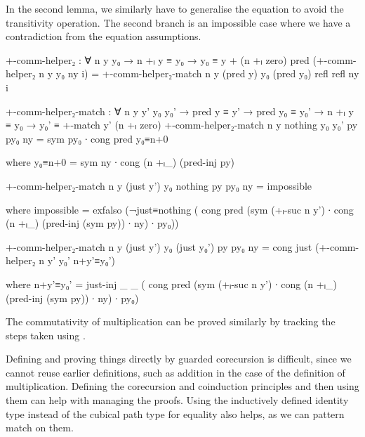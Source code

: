 In the second lemma, we similarly have to generalise the equation to avoid the
transitivity operation. The second branch is an impossible case where we have a
contradiction from the equation assumptions.
\begin{AgdaSuppressSpace}
\begin{code}
  +-comm-helper₂ :
    ∀ n y y₀ → n +ₗ y ≡ y₀ → y₀ ≡ y + (n +ₗ zero)
  pred (+-comm-helper₂ n y y₀ ny i) =
    +-comm-helper₂-match
      n y (pred y) y₀ (pred y₀) refl refl ny i

  +-comm-helper₂-match :
    ∀ n y y' y₀ y₀' →
    pred y ≡ y' → pred y₀ ≡ y₀' → n +ₗ y ≡ y₀ →
    y₀' ≡ +-match y' (n +ₗ zero)
  +-comm-helper₂-match n y nothing y₀ y₀' py py₀ ny =
    sym py₀ ∙ cong pred y₀≡n+0
\end{code}
\begin{code}[hide]
    where
    y₀≡n+0 = sym ny ∙ cong (n +ₗ_) (pred-inj py)
\end{code}
\begin{code}
  +-comm-helper₂-match n y (just y') y₀ nothing py py₀ ny
    = impossible
\end{code}
\begin{code}[hide]
    where
    impossible =
      exfalso
        (¬just≡nothing
          ( cong pred
              (sym (+ₗ-suc n y') ∙ cong (n +ₗ_) (pred-inj (sym py)) ∙ ny) ∙
            py₀))
\end{code}
\begin{code}
  +-comm-helper₂-match n y (just y') y₀ (just y₀') py py₀ ny
    = cong just (+-comm-helper₂ n y' y₀' n+y'≡y₀')
\end{code}
\begin{code}[hide]
    where
    n+y'≡y₀' =
      just-inj _ _
        ( cong pred
            (sym (+ₗ-suc n y') ∙ cong (n +ₗ_) (pred-inj (sym py)) ∙ ny) ∙
          py₀)
\end{code}
\end{AgdaSuppressSpace}

The commutativity of multiplication can be proved similarly by tracking the
steps taken using .

Defining and proving things directly by guarded corecursion is difficult, since
we cannot reuse earlier definitions, such as addition in the case of the
definition of multiplication. Defining the corecursion and coinduction
principles and then using them can help with managing the proofs. Using the
inductively defined identity type instead of the cubical path type for equality
also helps, as we can pattern match on them.
